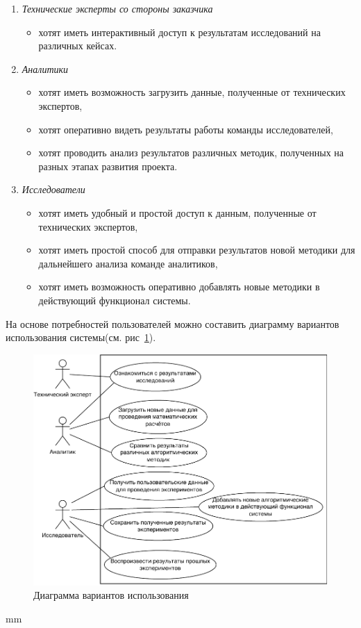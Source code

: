 \begin{enumerate}
    \item {
        \textit{Технические эксперты со стороны заказчика}
        \begin{itemize}
            \item хотят иметь интерактивный доступ к результатам исследований на различных кейсах.
        \end{itemize}
    }
    \item {
        \textit{Аналитики}
        \begin{itemize}
            \item хотят иметь возможность загрузить данные, полученные от технических экспертов,
            \item хотят оперативно видеть результаты работы команды исследователей,
            \item хотят проводить анализ результатов различных методик, полученных на разных этапах развития проекта.
        \end{itemize}
    }
    \item {
        \textit{Исследователи}
        \begin{itemize}
            \item хотят иметь удобный и простой доступ к данным, полученные от технических экспертов,
            \item хотят иметь простой способ для отправки результатов новой методики для дальнейшего анализа команде аналитиков,
            \item хотят иметь возможность оперативно добавлять новые методики в действующий функционал системы.
        \end{itemize}
    }
\end{enumerate}

На основе потребностей пользователей можно составить диаграмму вариантов использования системы(см.
рис\ \ref{pic:analysis__usecases-usecase}).

\begin{figure}[H]
	\includegraphics[width=\textwidth, left]{analysis/pictures/usecases/usecase}
	\caption{Диаграмма вариантов использования}
	\label{pic:analysis__usecases-usecase}
\end{figure}
 mm


